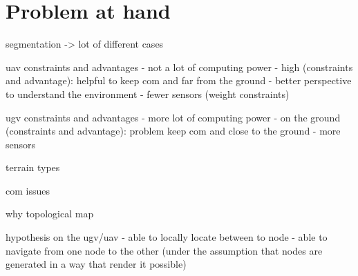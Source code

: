 




\section{Problem at hand}\label{sec:problem-at-hand}


segmentation -> lot of different cases

uav constraints and advantages
- not a lot of computing power
- high (constraints and advantage): helpful to keep com and far from the ground
- better perspective to understand the environment
- fewer sensors (weight constraints)

ugv constraints and advantages
- more lot of computing power
- on the ground (constraints and advantage): problem keep com and close to the ground
- more sensors


terrain types

com issues

why topological map

hypothesis on the ugv/uav
- able to locally locate between to node
- able to navigate from one node to the other (under the assumption that nodes are generated in a way that render it possible)

